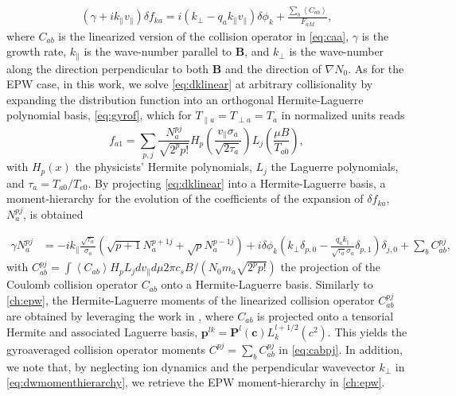 \begin{equation}
\begin{split}
    (\gamma+i k_\parallel v_\parallel)\delta f_{ka} = i\left(k_\perp - q_a k_\parallel v_\parallel \right)\delta\phi_k+\frac{\sum_b \left< C_{ab} \right>}{F_{aM}},
\end{split}
\label{eq:dklinear}
\end{equation}
%
\noindent where $C_{ab}$ is the linearized version of the collision operator in \cref{eq:caa}, $\gamma$ is the growth rate, $k_\parallel$ is the wave-number parallel to $\mathbf B$, and $k_\perp$ is the wave-number along the direction perpendicular to both $\mathbf B$ and the direction of $\nabla N_0$. 
%
As for the EPW case, in this work, we solve \cref{eq:dklinear} at arbitrary collisionality by expanding the distribution function into an orthogonal Hermite-Laguerre polynomial basis, \cref{eq:gyrof}, which for $T_{\parallel a}=T_{\perp a}=T_a$ in normalized units reads
%
\begin{equation}
    f_{a 1} = \sum_{p,j} \frac{N_a^{pj}}{\sqrt{2^p p!}}H_p\left(\frac{v_\parallel \sigma_a}{\sqrt{2 \tau_a}}\right)L_j\left(\frac{\mu B}{T_{a0}}\right),
\end{equation}
%
with $H_p(x)$ the physicists' Hermite polynomials, $L_j$ the Laguerre polynomials, and $\tau_a=T_{a0}/T_{e0}$.
%
By projecting \cref{eq:dklinear} into a Hermite-Laguerre basis, a moment-hierarchy for the evolution of the coefficients of the expansion of $\delta f_{ka}$, $N_{a}^{pj}$, is obtained

\begin{align}
    \gamma N_a^{pj} &= -i k_\parallel \frac{\sqrt{ \tau_a}}{\sigma_a}\left(\sqrt{{p+1}{}}N_a^{p+1 j}+\sqrt{{p}}N_a^{p-1 j}\right)+i\delta\phi_k \left(k_\perp \delta_{p,0}-\frac{q_a k_\parallel}{\sqrt{\tau_a}\sigma_a}\delta_{p,1}\right) \delta_{j,0}+\sum_b C_{ab}^{pj},
\label{eq:dwmomenthierarchy}
\end{align}
%
with $C_{ab}^{pj}=\int \left< C_{ab} \right> H_p L_j dv_\parallel d\mu 2\pi c_s B/(N_0 m_a \sqrt{2^p p!})$ the projection of the Coulomb collision operator $C_{ab}$ onto a Hermite-Laguerre basis.
%
Similarly to \cref{ch:epw}, the Hermite-Laguerre moments of the linearized collision operator $C_{ab}^{pj}$ are obtained by leveraging the work
in \citep{Ji2006}, where $C_{ab}$ is projected onto a tensorial Hermite and associated Laguerre basis, $\mathbf p^{lk}=\mathbf P^{l}(\mathbf c)L_k^{l+1/2}(c^2)$.
%
This yields the gyroaveraged collision operator moments $C^{pj}=\sum_b C_{ab}^{pj}$ in \cref{eq:cabpj}.
%
In addition, we note that, by neglecting ion dynamics and the perpendicular wavevector $k_\perp$ in \cref{eq:dwmomenthierarchy}, we retrieve the EPW moment-hierarchy in \cref{ch:epw}.


